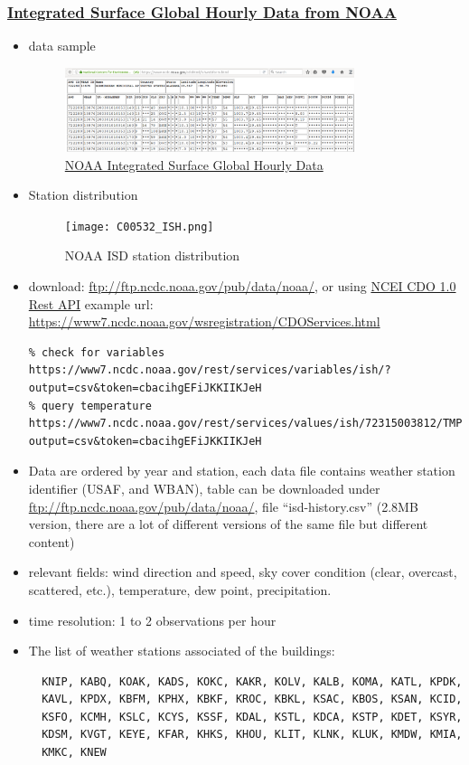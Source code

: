 \documentclass[12pt]{article}
\begin{document}
\subsubsection{\href{https://gis.ncdc.noaa.gov/geoportal/catalog/search/resource/details.page?id=gov.noaa.ncdc:C00532}{Integrated Surface Global Hourly Data from NOAA}}
\begin{itemize}
\item data sample
  \begin{figure}[h!]
    \centering
    \includegraphics[width=0.8\textwidth]{images/noaa_ish.png}
    \caption{\href{https://gis.ncdc.noaa.gov/geoportal/catalog/search/resource/details.page?id=gov.noaa.ncdc:C00532}{NOAA Integrated Surface Global Hourly Data}}
    \label{fig:noaa_ish}
  \end{figure}
  \FloatBarrier
\item Station distribution
  \begin{figure}[h!]
    \centering
    \texttt{[image: C00532\_ISH.png]}
    \caption{NOAA ISD station distribution}
    \label{fig:noaa_station}
  \end{figure}
  \FloatBarrier
\item download: \url{ftp://ftp.ncdc.noaa.gov/pub/data/noaa/}, or using
  \href{https://www7.ncdc.noaa.gov/rest/}{NCEI CDO 1.0 Rest API}
example url: \url{https://www7.ncdc.noaa.gov/wsregistration/CDOServices.html}
\begin{verbatim}
% check for variables
https://www7.ncdc.noaa.gov/rest/services/variables/ish/?output=csv&token=cbacihgEFiJKKIIKJeH
% query temperature
https://www7.ncdc.noaa.gov/rest/services/values/ish/72315003812/TMP/200101010000/200101022359/?output=csv&token=cbacihgEFiJKKIIKJeH
\end{verbatim}
\item Data are ordered by year and station, each data file contains
  weather station identifier (USAF, and WBAN), table can be downloaded
  under \url{ftp://ftp.ncdc.noaa.gov/pub/data/noaa/}, file
  ``isd-history.csv'' (2.8MB version, there are a lot of different
  versions of the same file but different content)
\item relevant fields: wind direction and speed, sky cover condition
  (clear, overcast, scattered, etc.), temperature, dew point,
  precipitation.
\item time resolution: 1 to 2 observations per hour
\item The list of weather stations associated of the buildings:
\begin{verbatim}
  KNIP, KABQ, KOAK, KADS, KOKC, KAKR, KOLV, KALB, KOMA, KATL, KPDK,
  KAVL, KPDX, KBFM, KPHX, KBKF, KROC, KBKL, KSAC, KBOS, KSAN, KCID,
  KSFO, KCMH, KSLC, KCYS, KSSF, KDAL, KSTL, KDCA, KSTP, KDET, KSYR,
  KDSM, KVGT, KEYE, KFAR, KHKS, KHOU, KLIT, KLNK, KLUK, KMDW, KMIA,
  KMKC, KNEW
\end{verbatim}
\end{itemize}
\end{document}
